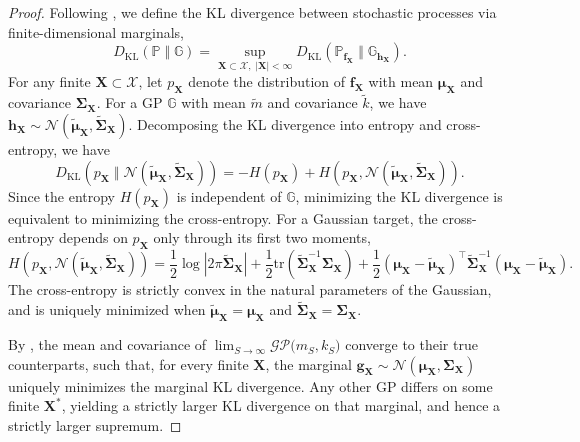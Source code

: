 \documentclass{article}
\newcommand{\K}{S}
\newcommand{\domain}{\mathcal{X}}
\newcommand{\bX}{\mathbf{X}}
\newcommand{\sample}{f}
\newcommand{\samplevec}{\mathbf{\sample}}
\begin{document}
\KLD*
\begin{proof}
Following \citep{sun2019functional}, we define the KL divergence between stochastic processes via finite-dimensional marginals,
\begin{equation*}
    D_{\mathrm{KL}} ( \mathbb{P} \;\Vert\; \mathbb{G} )
    = \sup_{\bX \subset \domain, \; |\bX| < \infty} D_{\mathrm{KL}} ( \mathbb{P}_{\samplevec_{\bX}} \;\Vert\; \mathbb{G}_{\mathbf{h}_{\bX}} ).
\end{equation*}
For any finite $\bX \subset \domain$, let $p_{\bX}$ denote the distribution of $\samplevec_{\bX}$ with mean $\boldsymbol{\mu}_{\bX}$ and covariance $\boldsymbol{\Sigma}_{\bX}$.
For a GP $\mathbb{G}$ with mean $\tilde{m}$ and covariance $\tilde{k}$, we have $\mathbf{h}_{\bX} \sim \mathcal{N}(\tilde{\boldsymbol{\mu}}_{\bX}, \tilde{\boldsymbol{\Sigma}}_{\bX})$.
Decomposing the KL divergence into entropy and cross-entropy, we have
\begin{equation*}
    D_{\mathrm{KL}} ( p_{\bX} \;\Vert\; \mathcal{N}(\tilde{\boldsymbol{\mu}}_{\bX}, \tilde{\boldsymbol{\Sigma}}_{\bX}) )
    = -H(p_{\bX}) + H(p_{\bX}, \mathcal{N}(\tilde{\boldsymbol{\mu}}_{\bX}, \tilde{\boldsymbol{\Sigma}}_{\bX})).
\end{equation*}
Since the entropy $H(p_{\bX})$ is independent of $\mathbb{G}$, minimizing the KL divergence is equivalent to minimizing the cross-entropy.
For a Gaussian target, the cross-entropy depends on $p_{\bX}$ only through its first two moments,
\begin{equation*}
    H(p_{\bX}, \mathcal{N}(\tilde{\boldsymbol{\mu}}_{\bX}, \tilde{\boldsymbol{\Sigma}}_{\bX}))
    = \frac{1}{2} \log | 2 \pi \tilde{\boldsymbol{\Sigma}}_{\bX} | + \frac{1}{2} \mathrm{tr}(\tilde{\boldsymbol{\Sigma}}_{\bX}^{-1} \boldsymbol{\Sigma}_{\bX}) + \frac{1}{2}(\boldsymbol{\mu}_{\bX} - \tilde{\boldsymbol{\mu}}_{\bX})^\top \tilde{\boldsymbol{\Sigma}}_{\bX}^{-1} (\boldsymbol{\mu}_{\bX} - \tilde{\boldsymbol{\mu}}_{\bX}).
\end{equation*}
The cross-entropy is strictly convex in the natural parameters of the Gaussian, and is uniquely minimized when $\tilde{\boldsymbol{\mu}}_{\bX} = \boldsymbol{\mu}_{\bX}$ and $\tilde{\boldsymbol{\Sigma}}_{\bX} = \boldsymbol{\Sigma}_{\bX}$.

By , the mean and covariance of $\lim_{S \to \infty} \mathcal{GP}\bigl(m_\K, k_\K\bigr)$ converge to their true counterparts, such that, for every finite $\bX$, the marginal $\mathbf{g}_{\bX} \sim \mathcal{N}(\boldsymbol{\mu}_{\bX}, \boldsymbol{\Sigma}_{\bX})$ uniquely minimizes the marginal KL divergence.
Any other GP differs on some finite $\bX^*$, yielding a strictly larger KL divergence on that marginal, and hence a strictly larger supremum.
\end{proof}
\end{document}
